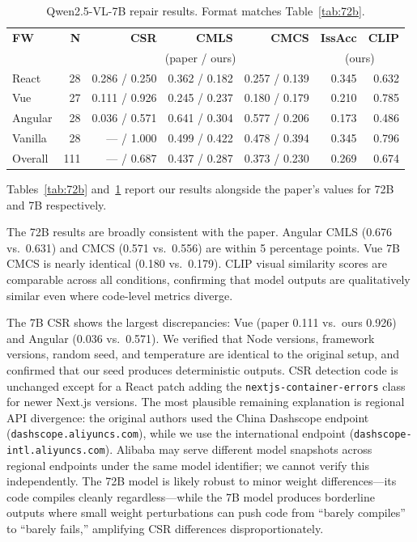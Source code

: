 \documentclass[11pt]{article}
\begin{document}
\begin{table}[t]
\centering
\small
\setlength{\tabcolsep}{4pt}
\begin{tabular}{lrrrrrr}
\toprule
\textbf{FW} & \textbf{N} & \textbf{CSR} & \textbf{CMLS} & \textbf{CMCS} & \textbf{IssAcc} & \textbf{CLIP} \\
 & & \multicolumn{3}{c}{\footnotesize (paper / ours)} & \multicolumn{2}{c}{\footnotesize (ours)} \\
\midrule
React   & 28 & 0.286 / 0.250 & 0.362 / 0.182 & 0.257 / 0.139 & 0.345 & 0.632 \\
Vue     & 27 & 0.111 / 0.926 & 0.245 / 0.237 & 0.180 / 0.179 & 0.210 & 0.785 \\
Angular & 28 & 0.036 / 0.571 & 0.641 / 0.304 & 0.577 / 0.206 & 0.173 & 0.486 \\
Vanilla & 28 & ---\phantom{0} / 1.000 & 0.499 / 0.422 & 0.478 / 0.394 & 0.345 & 0.796 \\
\midrule
Overall & 111 & ---\phantom{0} / 0.687 & 0.437 / 0.287 & 0.373 / 0.230 & 0.269 & 0.674 \\
\bottomrule
\end{tabular}
\caption{Qwen2.5-VL-7B repair results. Format matches Table~\ref{tab:72b}.}
\label{tab:7b}
\end{table}

Tables~\ref{tab:72b} and~\ref{tab:7b} report our results alongside the paper's values for 72B and 7B respectively.
 

 

The 72B results are broadly consistent with the paper. Angular CMLS
(0.676 vs.\ 0.631) and CMCS (0.571 vs.\ 0.556) are within 5 percentage
points. Vue 7B CMCS is nearly identical (0.180 vs.\ 0.179). CLIP visual
similarity scores are comparable across all conditions, confirming that
model outputs are qualitatively similar even where code-level metrics
diverge.

The 7B CSR shows the largest discrepancies: Vue (paper 0.111 vs.\ ours
0.926) and Angular (0.036 vs.\ 0.571). We verified that Node versions,
framework versions, random seed, and temperature are identical to the
original setup, and confirmed that our seed produces deterministic
outputs. CSR detection code is unchanged except for a React patch
adding the \texttt{nextjs-container-errors} class for newer Next.js
versions. The most plausible remaining explanation is regional API
divergence: the original authors used the China Dashscope endpoint
(\texttt{dashscope.aliyuncs.com}), while we use the international
endpoint (\texttt{dashscope-intl.aliyuncs.com}). Alibaba may serve
different model snapshots across regional endpoints under the same model
identifier; we cannot verify this independently. The 72B model is likely robust to
minor weight differences---its code compiles cleanly regardless---while
the 7B model produces borderline outputs where small weight
perturbations can push code from ``barely compiles'' to ``barely
fails,'' amplifying CSR differences disproportionately.
\end{document}
